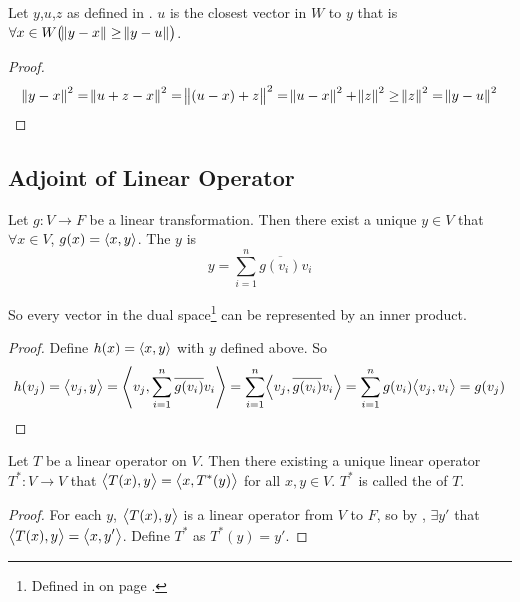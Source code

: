 \begin{theorem}
    Let $y$,$u$,$z$ as defined in . $u$ is the closest vector in $W$ to $y$ that is $\forall x \in W \mleft(\norm{y-x} \geq \norm{y - u} \mright)$.
\end{theorem}
\begin{proof}
    \begin{equation*}
        \norm{y - x}^2 = \norm{u + z - x}^2 = \norm{(u - x) + z}^2 = \norm{u - x}^2 + \norm{z}^2 \geq \norm{z}^2 = \norm{y - u}^2
    \end{equation*}
\end{proof}







\subsection{Adjoint of Linear Operator}

\begin{theorem}\label{uniquelinearoperatortof}
    Let $g: V \rightarrow F$ be a linear transformation. Then there exist a unique $y \in V$ that $\forall x \in V$, $g(x) = \innerproduct{x}{y}$. The $y$ is 
    \begin{equation}
        y = \sum_{i=1}^n \overline{g(v_i)} v_i
    \end{equation}
    
    So every vector in the dual space\footnote{Defined in  on page \pageref{dualspacedefinition}.} can be represented by an inner product.
\end{theorem}
\begin{proof}
    Define $h(x) = \innerproduct{x}{y}$ with $y$ defined above. So
    \begin{equation*}
        h(v_j) = \innerproduct{v_j}{y} = \innerproduct{v_j}{\sum_{i=1}^n \overline{g(v_i)} v_i} = \sum_{i=1}^n \innerproduct{v_j}{\overline{g(v_i)} v_i} = \sum_{i=1}^n g(v_i) \innerproduct{v_j}{ v_i} = g(v_j)
    \end{equation*}
\end{proof}



\begin{theorem}
    Let $T$ be a linear operator on $V$. Then there existing a unique linear operator $T^* : V \rightarrow V$ that $\innerproduct{T(x)}{y}=\innerproduct{x}{T^*(y)}$ for all $x,y \in V$. $T^*$ is called the  of $T$.
\end{theorem}
\begin{proof}
    For each $y$, $\innerproduct{T(x)}{y}$ is a linear operator from $V$ to $F$, so by , $\exists y'$ that $\innerproduct{T(x)}{y} = \innerproduct{x}{y'}$. Define $T^*$ as $T^*(y) = y'$.
\end{proof}

